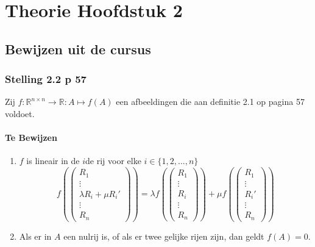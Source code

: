 \documentclass[lineaire_algebra_oplossingen.tex]{subfiles}
\begin{document}
\chapter{Theorie Hoofdstuk 2}
\section{Bewijzen uit de cursus}
\subsection{Stelling 2.2 p 57}
Zij $f : \mathbb{R}^{n\times n} \rightarrow \mathbb{R}:A\mapsto f(A)$ een afbeeldingen die aan definitie 2.1 op pagina 57 voldoet.
\subsubsection*{Te Bewijzen}
\begin{enumerate}
\item $f$ is lineair in de $i$de rij voor elke $i\in \{1,2,...,n\}$
\[
f\left(
\begin{pmatrix}
R_1 \\ \vdots \\ \lambda R_i + \mu R_i' \\ \vdots \\R_n
\end{pmatrix}
\right)
=
\lambda
f\left(
\begin{pmatrix}
R_1 \\ \vdots \\ R_i\\\vdots \\R_n
\end{pmatrix}
\right)
+
\mu 
f
\left(
\begin{pmatrix}
R_1 \\ \vdots \\ R_i' \\\vdots \\R_n
\end{pmatrix}
\right)
\] 
\item Als er in $A$ een nulrij is, of als er twee gelijke rijen zijn, dan geldt $f(A)=0$.
\end{enumerate}
\end{document}
